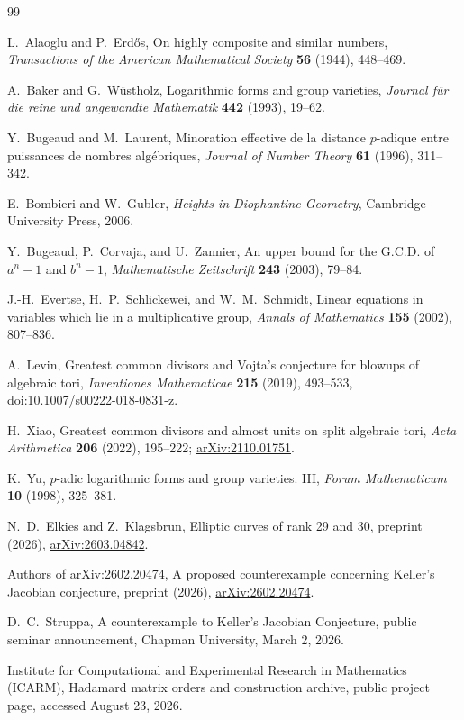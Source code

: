 \documentclass[11pt,oneside]{article}
\theoremstyle{definition}
\begin{document}
\begin{thebibliography}{99}

L.~Alaoglu and P.~Erd\H{o}s,
\newblock On highly composite and similar numbers,
\newblock \emph{Transactions of the American Mathematical Society}
\textbf{56} (1944), 448--469.

A.~Baker and G.~W\"ustholz,
\newblock Logarithmic forms and group varieties,
\newblock \emph{Journal f\"ur die reine und angewandte Mathematik}
\textbf{442} (1993), 19--62.

Y.~Bugeaud and M.~Laurent,
\newblock Minoration effective de la distance $p$-adique entre puissances
de nombres alg\'ebriques,
\newblock \emph{Journal of Number Theory} \textbf{61} (1996), 311--342.

E.~Bombieri and W.~Gubler,
\newblock \emph{Heights in Diophantine Geometry},
\newblock Cambridge University Press, 2006.

Y.~Bugeaud, P.~Corvaja, and U.~Zannier,
\newblock An upper bound for the G.C.D. of $a^n-1$ and $b^n-1$,
\newblock \emph{Mathematische Zeitschrift} \textbf{243} (2003), 79--84.

J.-H.~Evertse, H.~P.~Schlickewei, and W.~M.~Schmidt,
\newblock Linear equations in variables which lie in a multiplicative group,
\newblock \emph{Annals of Mathematics} \textbf{155} (2002), 807--836.

A.~Levin,
\newblock Greatest common divisors and Vojta's conjecture for blowups of
algebraic tori,
\newblock \emph{Inventiones Mathematicae} \textbf{215} (2019), 493--533,
\newblock \href{https://doi.org/10.1007/s00222-018-0831-z}{doi:10.1007/s00222-018-0831-z}.

H.~Xiao,
\newblock Greatest common divisors and almost units on split algebraic tori,
\newblock \emph{Acta Arithmetica} \textbf{206} (2022), 195--222;
\newblock \href{https://arxiv.org/abs/2110.01751}{arXiv:2110.01751}.

K.~Yu,
\newblock $p$-adic logarithmic forms and group varieties. III,
\newblock \emph{Forum Mathematicum} \textbf{10} (1998), 325--381.

N.~D.~Elkies and Z.~Klagsbrun,
\newblock Elliptic curves of rank 29 and 30,
\newblock preprint (2026),
\newblock \href{https://arxiv.org/abs/2603.04842}{arXiv:2603.04842}.

Authors of arXiv:2602.20474,
\newblock A proposed counterexample concerning Keller's Jacobian conjecture,
\newblock preprint (2026),
\newblock \href{https://arxiv.org/abs/2602.20474}{arXiv:2602.20474}.

D.~C.~Struppa,
\newblock A counterexample to Keller's Jacobian Conjecture,
\newblock public seminar announcement, Chapman University, March 2, 2026.

Institute for Computational and Experimental Research in Mathematics
(ICARM),
\newblock Hadamard matrix orders and construction archive,
\newblock public project page, accessed August 23, 2026.

\end{thebibliography}
\end{document}
